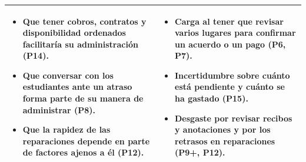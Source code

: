 \documentclass[12pt,a4paper]{article}
\begin{document}
{\begin{tabularx}{\linewidth}{|X|X|}
\begin{itemize}[leftmargin=*,itemsep=1pt,topsep=2pt,label=--]
\item {Que tener cobros, contratos y disponibilidad ordenados facilitaría su administración (P14).}
\item {Que conversar con los estudiantes ante un atraso forma parte de su manera de administrar (P8).}
\item {Que la rapidez de las reparaciones depende en parte de factores ajenos a él (P12).}
\end{itemize}
&
\begin{itemize}[leftmargin=*,itemsep=1pt,topsep=2pt,label=--]
\item {Carga al tener que revisar varios lugares para confirmar un acuerdo o un pago (P6, P7).}
\item {Incertidumbre sobre cuánto está pendiente y cuánto se ha gastado (P15).}
\item {Desgaste por revisar recibos y anotaciones y por los retrasos en reparaciones (P9+, P12).}
\end{itemize} \\ \hline
\end{tabularx}
}
\end{document}
